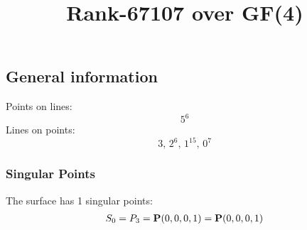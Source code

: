 \documentclass{article}
\newcommand\setTBstruts{\def\T{\rule{0pt}{2.6ex}}%
\def\B{\rule[-1.2ex]{0pt}{0pt}}}
\newcommand{\bP}{{\bf P}}
\begin{document}
 
\setTBstruts



{\allowdisplaybreaks%






\title{Rank-67107 over GF(4)}
\author{}%
\maketitle%
%
{}



\subsection*{General information}
Points on lines:
$$
5^6$$
Lines on points:
$$
3,\,2^6,\,1^{15},\,0^7$$
\subsubsection*{Singular Points}
The surface has 1 singular points:\\
\begin{align*}
S_{0} &= P_{3}=\bP(0, 0, 0, 1) = \bP(0, 0, 0, 1)\\
\end{align*}
}
\end{document}
